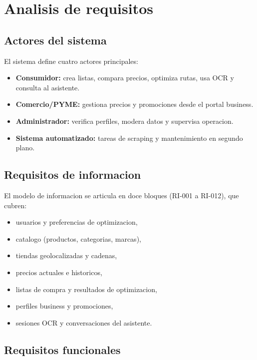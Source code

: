 \chapter{Analisis de requisitos}\label{requisitos}

\section{Actores del sistema}

El sistema define cuatro actores principales:

\begin{itemize}
	\item \textbf{Consumidor:} crea listas, compara precios, optimiza rutas, usa OCR
		y consulta al asistente.
	\item \textbf{Comercio/PYME:} gestiona precios y promociones desde el portal business.
	\item \textbf{Administrador:} verifica perfiles, modera datos y supervisa operacion.
	\item \textbf{Sistema automatizado:} tareas de scraping y mantenimiento en segundo plano.
\end{itemize}

\section{Requisitos de informacion}

El modelo de informacion se articula en doce bloques (RI-001 a RI-012), que cubren:

\begin{itemize}
	\item usuarios y preferencias de optimizacion,
	\item catalogo (productos, categorias, marcas),
	\item tiendas geolocalizadas y cadenas,
	\item precios actuales e historicos,
	\item listas de compra y resultados de optimizacion,
	\item perfiles business y promociones,
	\item sesiones OCR y conversaciones del asistente.
\end{itemize}

\section{Requisitos funcionales}

